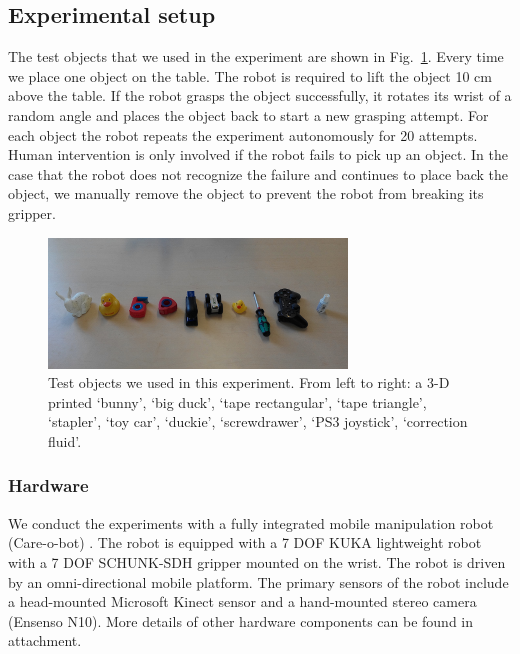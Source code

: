 \subsection{Experimental setup}
The test objects that we used in the experiment are shown in Fig.~\ref{fig:test_objects}. Every time we place one object on the table. The robot is required to lift the object 10 cm above the table. If the robot grasps the object successfully, it rotates its wrist of a random angle and places the object back to start a new grasping attempt. For each object the robot repeats the experiment autonomously for 20 attempts. Human intervention is only involved if the robot fails to pick up an object. In the case that the robot does not recognize the failure and continues to place back the object,  we manually remove the object to prevent the robot from breaking its gripper.  

\begin{figure}[!htbp] 
\centering
\includegraphics[width=0.7\linewidth]
{figure/test_object.png}%
\caption{Test objects we used in this experiment. From left to right: a 3-D printed `bunny', `big duck', `tape rectangular', `tape triangle', `stapler', `toy car', `duckie', `screwdrawer', `PS3 joystick', `correction fluid'. }
\label{fig:test_objects}
\end{figure}	
   
\subsubsection{Hardware}
We conduct the experiments with a fully integrated mobile manipulation robot (Care-o-bot) \todo {[cite]}. The robot is equipped with a 7 DOF KUKA lightweight robot with a 7 DOF SCHUNK-SDH gripper mounted on the wrist. The robot is driven by an omni-directional mobile platform. The primary sensors of the robot include a head-mounted Microsoft Kinect sensor and a
hand-mounted stereo camera (Ensenso N10). More details of other hardware components can be found in attachment. 

